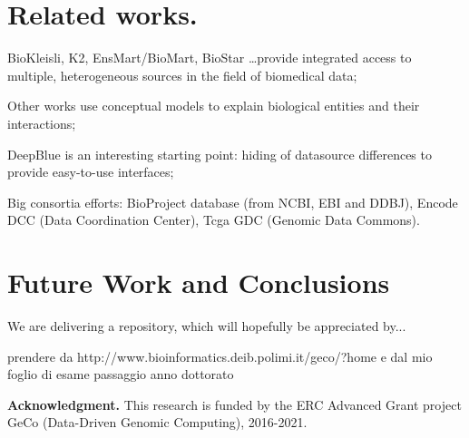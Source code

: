 \documentclass[journal]{IEEEtran}
\begin{document}
\section{Related works.}
BioKleisli, K2, EnsMart/BioMart, BioStar \ldots provide integrated access to multiple, heterogeneous sources in the field of biomedical data;

Other works use conceptual models to explain biological entities and their interactions;

DeepBlue is an interesting starting point:  hiding of datasource differences to provide easy-to-use interfaces;

Big consortia efforts: BioProject database (from NCBI, EBI and DDBJ), Encode DCC (Data Coordination Center), Tcga GDC (Genomic Data Commons).


\section{Future Work and Conclusions}
We are delivering a repository, which will hopefully be appreciated by...


\cite{bernasconi2017conceptual}


prendere da http://www.bioinformatics.deib.polimi.it/geco/?home
e dal mio foglio di esame passaggio anno dottorato

{\bf Acknowledgment.} This research is funded by the ERC Advanced Grant project GeCo (Data-Driven Genomic Computing), 2016-2021.


 
\end{document}
